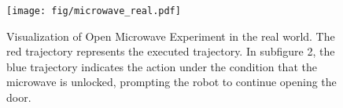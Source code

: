 \begin{figure}
  \vspace{-2mm}
  \centering
  \texttt{[image: fig/microwave\_real.pdf]}
  \caption{Visualization of Open Microwave Experiment in the real world. The red trajectory represents the executed trajectory. In subfigure 2, the blue trajectory indicates the action under the condition that the microwave is unlocked, prompting the robot to continue opening the door.
  }
  \label{fig:fig1}
\vspace{-2mm}
\end{figure}
